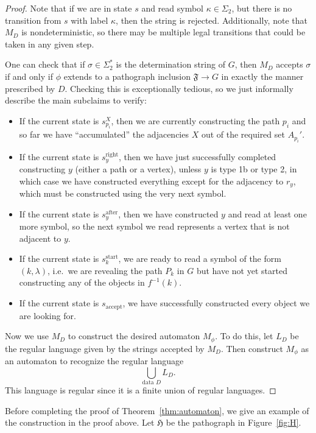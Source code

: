 \documentclass{article}
\newcommand{\Ff}{\mathfrak{F}}
\newcommand{\Hf}{\mathfrak{H}}
\begin{document}
\begin{proof}
Note that if we are in state $s$ and read symbol $\kappa\in\Sigma_2$, but there is no transition from $s$ with label $\kappa$, then the string is rejected. Additionally, note that $M_D$ is nondeterministic, so there may be multiple legal transitions that could be taken in any given step.

One can check that if $\sigma\in\Sigma_2^*$ is the determination string of $G$, then $M_D$ accepts $\sigma$ if and only if $\phi$ extends to a pathograph inclusion $\Ff\to G$ in exactly the manner prescribed by $D$. Checking this is exceptionally tedious, so we just informally describe the main subclaims to verify:
\begin{itemize}
    \item If the current state is $s_{p_i}^X$, then we are currently constructing the path $p_i$ and so far we have ``accumulated'' the adjacencies $X$ out of the required set $A_{p_i}'$.
    \item If the current state is $s_y^{\text{right}}$, then we have just successfully completed constructing $y$ (either a path or a vertex), unless $y$ is type 1b or type 2, in which case we have constructed everything except for the adjacency to $r_y$, which must be constructed using the very next symbol.
    \item If the current state is $s_y^{\text{after}}$, then we have constructed $y$ and read at least one more symbol, so the next symbol we read represents a vertex that is not adjacent to $y$.
    \item If the current state is $s_k^{\text{start}}$, we are ready to read a symbol of the form $(k, \lambda)$, i.e.\ we are revealing the path $P_k$ in $G$ but have not yet started constructing any of the objects in $f^{-1}(k)$.
    \item If the current state is $s_{\text{accept}}$, we have successfully constructed every object we are looking for.
\end{itemize}

Now we use $M_D$ to construct the desired automaton $M_\phi$. To do this, let $L_D$ be the regular language given by the strings accepted by $M_D$. Then construct $M_\phi$ as an automaton to recognize the regular language
\[ \bigcup_{\text{data }D} L_D. \]
This language is regular since it is a finite union of regular languages.
\end{proof}

Before completing the proof of Theorem~\ref{thm:automaton}, we give an example of the construction in the proof above. Let $\Hf$ be the pathograph in Figure~\ref{fig:H}.
\end{document}
